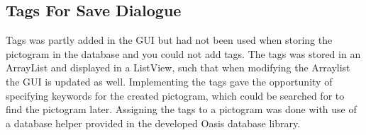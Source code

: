 \subsection{Tags For Save Dialogue}
Tags was partly added in the GUI but had not been used when storing the pictogram in the database and you could not add tags.
The tags was stored in an ArrayList and displayed in a ListView, such that when modifying the Arraylist the GUI is updated as well.
Implementing the tags gave the opportunity of specifying keywords for the created pictogram, which could be searched for to find the pictogram later.
Assigning the tags to a pictogram was done with use of a database helper provided in the developed Oasis database library.
